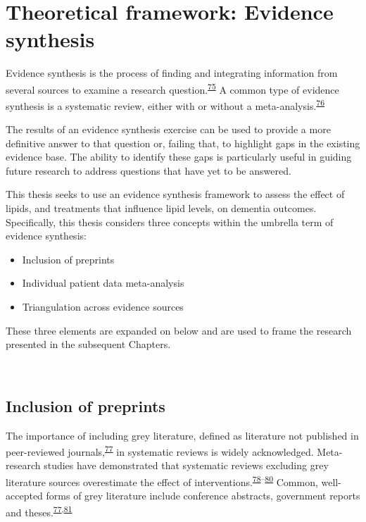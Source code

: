 \documentclass[a4paper, twoside]{templates/ociamthesis}
\providecommand{\tightlist}{%
  \setlength{\itemsep}{0pt}\setlength{\parskip}{0pt}}
\begin{document}
~

\hypertarget{theoretical-framework-evidence-synthesis}{%
\section{Theoretical framework: Evidence synthesis}\label{theoretical-framework-evidence-synthesis}}

Evidence synthesis is the process of finding and integrating information from several sources to examine a research question.\textsuperscript{\protect\hyperlink{ref-donnelly2018}{75}} A common type of evidence synthesis is a systematic review, either with or without a meta-analysis.\textsuperscript{\protect\hyperlink{ref-chandler2019chapter}{76}}

The results of an evidence synthesis exercise can be used to provide a more definitive answer to that question or, failing that, to highlight gaps in the existing evidence base. The ability to identify these gaps is particularly useful in guiding future research to address questions that have yet to be answered.

This thesis seeks to use an evidence synthesis framework to assess the effect of lipids, and treatments that influence lipid levels, on dementia outcomes. Specifically, this thesis considers three concepts within the umbrella term of evidence synthesis:

\begin{itemize}
\tightlist
\item
  Inclusion of preprints
\item
  Individual patient data meta-analysis
\item
  Triangulation across evidence sources
\end{itemize}

These three elements are expanded on below and are used to frame the research presented in the subsequent Chapters.

~

\hypertarget{diverse-sources-preprints}{%
\subsection{Inclusion of preprints}\label{diverse-sources-preprints}}

The importance of including grey literature, defined as literature not published in peer-reviewed journals,\textsuperscript{\protect\hyperlink{ref-paez2017}{77}} in systematic reviews is widely acknowledged. Meta-research studies have demonstrated that systematic reviews excluding grey literature sources overestimate the effect of interventions.\textsuperscript{\protect\hyperlink{ref-conn2003}{78}--\protect\hyperlink{ref-hopewell2007}{80}} Common, well-accepted forms of grey literature include conference abstracts, government reports and theses.\textsuperscript{\protect\hyperlink{ref-paez2017}{77},\protect\hyperlink{ref-lefebvre2019searching}{81}}
\end{document}
